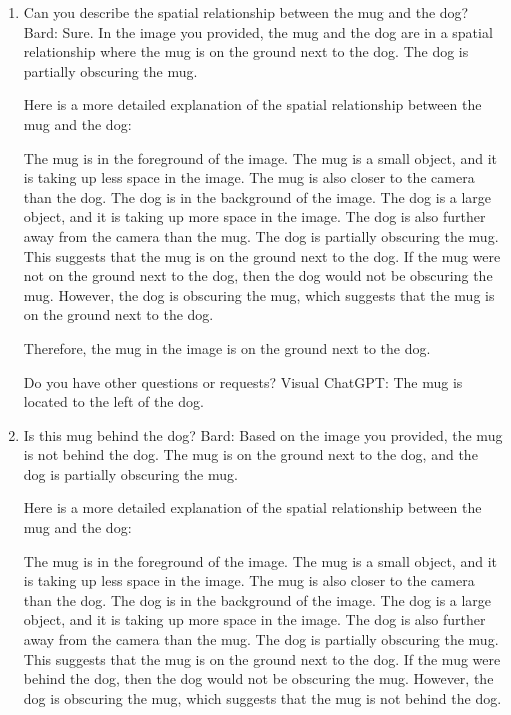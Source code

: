 \begin{enumerate}
    \item Can you describe the spatial relationship between the mug and the dog?
    \subitem Bard: 
    Sure. In the image you provided, the mug and the dog are in a spatial relationship where the mug is on the ground next to the dog. The dog is partially obscuring the mug.
    
    Here is a more detailed explanation of the spatial relationship between the mug and the dog:
    
    The mug is in the foreground of the image. The mug is a small object, and it is taking up less space in the image. The mug is also closer to the camera than the dog.
    The dog is in the background of the image. The dog is a large object, and it is taking up more space in the image. The dog is also further away from the camera than the mug.
    The dog is partially obscuring the mug. This suggests that the mug is on the ground next to the dog.
    If the mug were not on the ground next to the dog, then the dog would not be obscuring the mug. However, the dog is obscuring the mug, which suggests that the mug is on the ground next to the dog.
    
    Therefore, the mug in the image is on the ground next to the dog.
    
    Do you have other questions or requests?
    \subitem Visual ChatGPT: The mug is located to the left of the dog.
    \item Is this mug behind the dog?
    \subitem Bard: 
    Based on the image you provided, the mug is not behind the dog. The mug is on the ground next to the dog, and the dog is partially obscuring the mug.
    
    Here is a more detailed explanation of the spatial relationship between the mug and the dog:
    
    The mug is in the foreground of the image. The mug is a small object, and it is taking up less space in the image. The mug is also closer to the camera than the dog.
    The dog is in the background of the image. The dog is a large object, and it is taking up more space in the image. The dog is also further away from the camera than the mug.
    The dog is partially obscuring the mug. This suggests that the mug is on the ground next to the dog.
    If the mug were behind the dog, then the dog would not be obscuring the mug. However, the dog is obscuring the mug, which suggests that the mug is not behind the dog.
    

\end{enumerate}
